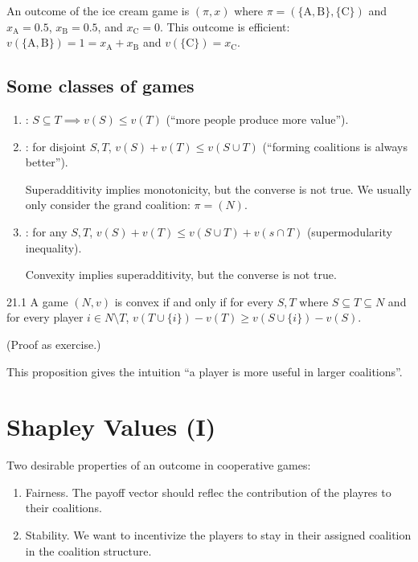 \documentclass[12pt,letterpaper]{report}
\begin{document}
\begin{ex}
  An outcome of the ice cream game is $(\pi, x)$ where
  $\pi = (\{\text{A}, \text{B}\}, \{\text{C}\})$ and $x_\text{A} = 0.5$, $x_\text{B} = 0.5$, and
  $x_\text{C} = 0$.
  This outcome is efficient: $v(\{\text{A}, \text{B}\}) = 1 = x_\text{A} + x_\text{B}$ and
  $v(\{\text{C}\}) = x_\text{C}$.
\end{ex}

\pagebreak
\subsection{Some classes of games}

\begin{enumerate}
  \item
  : $S \subseteq T \implies v(S) \leq v(T)$ (``more people produce more
  value'').
  \item
  : for disjoint $S, T$, $v(S) + v(T) \leq v(S \cup T)$ (``forming
  coalitions is always better'').

  Superadditivity implies monotonicity, but the converse is not true.
  We usually only consider the grand coalition: $\pi = (N)$.
  \item
  : for any $S, T$, $v(S) + v(T) \leq v(S \cup T) + v(s \cap T)$
  (supermodularity inequality).

  Convexity implies superadditivity, but the converse is not true.
\end{enumerate}

\begin{prop}{}{21.1}
  A game $(N, v)$ is convex if and only if for every $S, T$ where $S \subseteq T \subseteq N$ and
  for every player $i \in N \setminus T$, $v(T \cup \{i\}) - v(T) \geq v(S \cup \{i\}) - v(S)$.
\end{prop}

(Proof as exercise.)

This proposition gives the intuition ``a player is more useful in larger coalitions''.

\section{Shapley Values (I)}

Two desirable properties of an outcome in cooperative games:
\begin{enumerate}
  \item
  Fairness.
  The payoff vector should reflec the contribution of the playres to their coalitions.
  \item
  Stability.
  We want to incentivize the players to stay in their assigned coalition in the coalition structure.
\end{enumerate}
\end{document}
